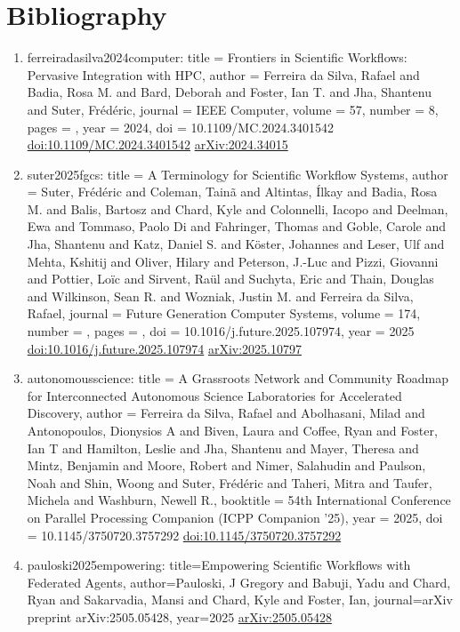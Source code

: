 \documentclass[11pt]{article}
\begin{document}
\section*{Bibliography}
\begin{enumerate}[leftmargin=*]
  \item ferreiradasilva2024computer: title = Frontiers in Scientific Workflows: Pervasive Integration with HPC, author = Ferreira da Silva, Rafael and Badia, Rosa M. and Bard, Deborah and Foster, Ian T. and Jha, Shantenu and Suter, Frédéric, journal = IEEE Computer, volume = 57, number = 8, pages = , year = 2024, doi = 10.1109/MC.2024.3401542 \href{https://doi.org/10.1109/MC.2024.3401542}{doi:10.1109/MC.2024.3401542} \href{https://arxiv.org/abs/2024.34015}{arXiv:2024.34015}
  \item suter2025fgcs: title = A Terminology for Scientific Workflow Systems, author = Suter, Frédéric and Coleman, Tainã and Altintas, Ílkay and Badia, Rosa M. and Balis, Bartosz and Chard, Kyle and Colonnelli, Iacopo and Deelman, Ewa and Tommaso, Paolo Di and Fahringer, Thomas and Goble, Carole and Jha, Shantenu and Katz, Daniel S. and Köster, Johannes and Leser, Ulf and Mehta, Kshitij and Oliver, Hilary and Peterson, J.-Luc and Pizzi, Giovanni and Pottier, Loïc and Sirvent, Raül and Suchyta, Eric and Thain, Douglas and Wilkinson, Sean R. and Wozniak, Justin M. and Ferreira da Silva, Rafael, journal = Future Generation Computer Systems, volume = 174, number = , pages = , doi = 10.1016/j.future.2025.107974, year = 2025 \href{https://doi.org/10.1016/j.future.2025.107974}{doi:10.1016/j.future.2025.107974} \href{https://arxiv.org/abs/2025.10797}{arXiv:2025.10797}
  \item autonomousscience: title = A Grassroots Network and Community Roadmap for Interconnected Autonomous Science Laboratories for Accelerated Discovery, author = Ferreira da Silva, Rafael and Abolhasani, Milad and Antonopoulos, Dionysios A and Biven, Laura and Coffee, Ryan and Foster, Ian T and Hamilton, Leslie and Jha, Shantenu and Mayer, Theresa and Mintz, Benjamin and Moore, Robert and Nimer, Salahudin and Paulson, Noah and Shin, Woong and Suter, Frédéric and Taheri, Mitra and Taufer, Michela and Washburn, Newell R., booktitle = 54th International Conference on Parallel Processing Companion (ICPP Companion '25), year = 2025, doi = 10.1145/3750720.3757292 \href{https://doi.org/10.1145/3750720.3757292}{doi:10.1145/3750720.3757292}
  \item pauloski2025empowering: title=Empowering Scientific Workflows with Federated Agents, author=Pauloski, J Gregory and Babuji, Yadu and Chard, Ryan and Sakarvadia, Mansi and Chard, Kyle and Foster, Ian, journal=arXiv preprint arXiv:2505.05428, year=2025 \href{https://arxiv.org/abs/2505.05428}{arXiv:2505.05428}

\end{enumerate}
\end{document}
